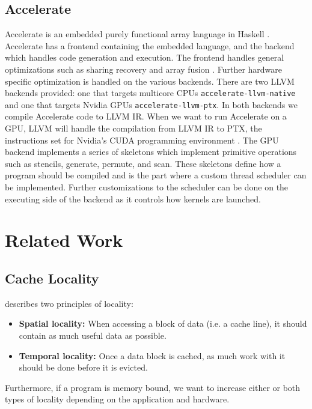 \documentclass{article}
\begin{document}

\subsection{Accelerate}
\label{sec:accelerate}
Accelerate is an embedded purely functional array language in Haskell \cite{chakravarty2011accelerating}.
Accelerate has a frontend containing the embedded language, and the backend which handles code generation and execution.
The frontend handles general optimizations such as sharing recovery and array fusion \cite{mcdonell2013optimising,balen2020optimal}.
Further hardware specific optimization is handled on the various backends.
There are two LLVM \cite{llvm} backends provided: one that targets multicore CPUs \texttt{accelerate-llvm-native} and one that targets Nvidia GPUs \texttt{accelerate-llvm-ptx}.
In both backends we compile Accelerate code to LLVM IR.
When we want to run Accelerate on a GPU, LLVM will handle the compilation from LLVM IR to PTX, the instructions set for Nvidia's CUDA programming environment \cite{mcdonell2015type, llvm, nvidia2021cudadocs}.
The GPU backend implements a series of skeletons which implement primitive operations such as stencils, generate, permute, and scan.
These skeletons define how a program should be compiled and is the part where a custom thread scheduler can be implemented.
Further customizations to the scheduler can be done on the executing side of the backend as it controls how kernels are launched.

\section{Related Work}

\subsection{Cache Locality}
\citeauthor{meyer2003algorithms} describes two principles of locality\cite{meyer2003algorithms}:
\begin{itemize}
    \item \textbf{Spatial locality:} When accessing a block of data (i.e. a cache line), it should contain as much useful data as possible.
    \item \textbf{Temporal locality:} Once a data block is cached, as much work with it should be done before it is evicted.
\end{itemize}
Furthermore, if a program is memory bound, we want to increase either or both types of locality depending on the application and hardware.
\end{document}
